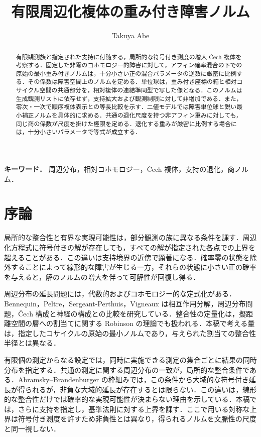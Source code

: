 \documentclass[11pt,a4paper]{article}
\title{有限周辺化複体の重み付き障害ノルム}
\author{Takuya Abe}
\date{}
\numberwithin{equation}{section}
\theoremstyle{japanese}
\theoremstyle{remark}
\begin{document}
\maketitle
\begin{abstract}
有限観測族と指定された支持に付随する，局所的な符号付き測度の増大 {\latinfont\v{C}ech} 複体を考察する．固定した非零のコホモロジー的障害に対して，アフィン確率混合の下での原始の最小重み付きノルムは，十分小さい正の混合パラメータの逆数に厳密に比例する．その係数は障害空間上のノルムを定める．単位球は，重み付き座標の箱と相対コサイクル空間の共通部分を，相対複体の連結準同型で写した像となる．このノルムは生成観測リストに依存せず，支持拡大および観測制限に対して非増加である．また，零次・一次で順序複体表示との等長比較を示す．二値モデルでは障害単位球と鋭い最小補正ノルムを具体的に求める．共通の退化尺度を持つ非アフィン重みに対しても，同じ商の係数が尺度を掛けた極限を定める．退化する重みが厳密に比例する場合には，十分小さいパラメータで等式が成立する．
\end{abstract}
\noindent\textbf{キーワード．} 周辺分布，相対コホモロジー，{\latinfont\v{C}ech} 複体，支持の退化，商ノルム．

\section{序論}
局所的な整合性と有界な実現可能性は，部分観測の族に異なる条件を課す．周辺化方程式に符号付きの解が存在しても，すべての解が指定された各点での上界を超えることがある．この違いは支持境界の近傍で顕著になる．確率零の状態を除外することによって線形的な障害が生じる一方，それらの状態に小さい正の確率を与えると，解のノルムの増大を伴って可解性が回復し得る．

周辺分布の延長問題には，代数的およびコホモロジー的な定式化がある．Bennequin，Peltre，Sergeant-Perthuis，Vigneaux は相互作用分解，周辺分布問題，{\latinfont\v{C}ech} 構成と神経の構成との比較を研究している\cite[Sections~5--6]{BPSV}．整合性の定量化は，擬距離空間の層への割当てに関する Robinson の理論でも扱われる\cite[Definitions~7 and~9]{Robinson}．本稿で考える量は，指定したコサイクルの原始の最小ノルムであり，与えられた割当ての整合性半径とは異なる．

有限個の測定からなる設定では，同時に実施できる測定の集合ごとに結果の同時分布を指定する．共通の測定に関する周辺分布の一致が，局所的な整合条件である．Abramsky--Brandenburger の枠組みでは，この条件から大域的な符号付き延長が得られるが，非負な大域的延長が存在するとは限らない\cite[Theorems~5.5 and~5.9]{AB}．この違いは，線形的な整合性だけでは確率的な実現可能性が決まらない理由を示している．本稿では，さらに支持を指定し，基準法則に対する上界を課す．ここで用いる対称な上界は符号付き測度を許すため非負性とは異なり，得られるノルムを文脈性の尺度と同一視しない．
\end{document}
